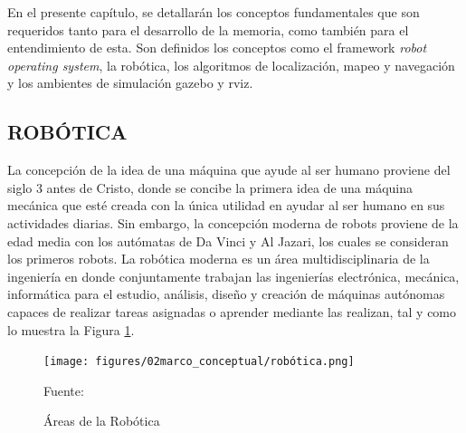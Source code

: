 
En el presente capítulo, se detallarán los conceptos fundamentales que son requeridos tanto para el desarrollo de la memoria, como también para el entendimiento de esta. Son definidos los conceptos como el framework \textit{robot operating system}, la robótica, los algoritmos de localización, mapeo y navegación y los ambientes de simulación gazebo y rviz.

\subsection{ROBÓTICA}
La concepción de la idea de una máquina que ayude al ser humano proviene del siglo 3 antes de Cristo, donde se concibe la primera idea de una máquina mecánica que esté creada con la única utilidad en ayudar al ser humano en sus actividades diarias. Sin embargo, la concepción moderna de robots proviene de la edad media con los autómatas de Da Vinci y Al Jazari, los cuales se consideran los primeros robots.
La robótica moderna es un área multidisciplinaria de la ingeniería en donde conjuntamente trabajan las ingenierías electrónica, mecánica, informática para el estudio, análisis, diseño y creación de máquinas autónomas capaces de realizar tareas asignadas o aprender mediante las realizan, tal y como lo muestra la Figura \ref{fig:areas_robotica}. 
\begin{figure}[h]
\centering
\texttt{[image: figures/02marco\_conceptual/robótica.png]}
\caption{\label{fig:areas_robotica} Áreas de la Robótica} 
Fuente: \cite{area_rob_2017}
\end{figure}

\newpage
